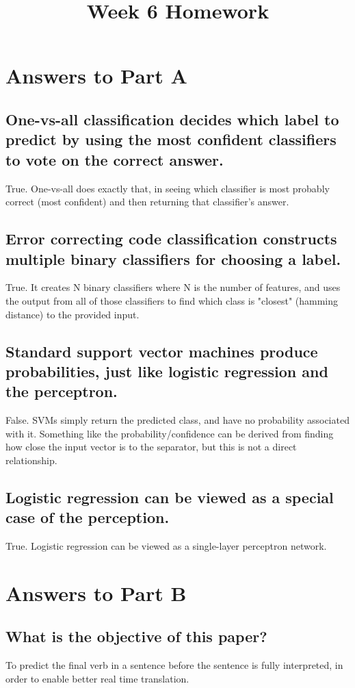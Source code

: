 \documentclass{article}
\title{Week 6 Homework}
\begin{document}
 

\section{Answers to Part A}
\subsection{One-vs-all classification decides which label to predict by using the most confident classifiers to vote on the correct answer.}
True. One-vs-all does exactly that, in seeing which classifier is most probably correct (most confident) and then returning that classifier's answer.

\subsection{Error correcting code classification constructs multiple binary classifiers for choosing a label.}
True. It creates N binary classifiers where N is the number of features, and uses the output from all of those classifiers to find which class is "closest" (hamming distance) to the provided input. 

\subsection{Standard support vector machines produce probabilities, just like logistic regression and the perceptron.}
False. SVMs simply return the predicted class, and have no probability associated with it. Something like the probability/confidence can be derived from finding how close the input vector is to the separator, but this is not a direct relationship.

\subsection{Logistic regression can be viewed as a special case of the perception.}
True. Logistic regression can be viewed as a single-layer perceptron network.

\section{Answers to Part B}
\subsection{What is the objective of this paper?}
To predict the final verb in a sentence before the sentence is fully interpreted, in order to enable better real time translation. 
\end{document}
